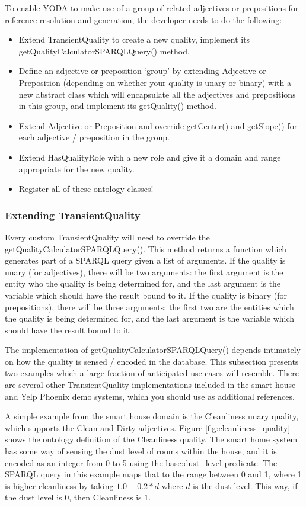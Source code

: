 \documentclass[titlepage]{article}
\begin{document}
\noindent To enable YODA to make use of a group of related adjectives or prepositions for reference resolution and generation, the developer needs to do the following:
\begin{itemize}
\item Extend TransientQuality to create a new quality, implement its getQualityCalculatorSPARQLQuery() method.
\item Define an adjective or preposition `group' by extending Adjective or Preposition (depending on whether your quality is unary or binary) with a new abstract class which will encapsulate all the adjectives and prepositions in this group, and implement its getQuality() method.
\item Extend Adjective or Preposition and override getCenter() and getSlope() for each adjective / preposition in the group.
\item Extend HasQualityRole with a new role and give it a domain and range appropriate for the new quality.
\item Register all of these ontology classes!
\end{itemize}


\subsubsection{Extending TransientQuality}

Every custom TransientQuality will need to override the getQualityCalculatorSPARQLQuery().
This method returns a function which generates part of a SPARQL query given a list of arguments.
If the quality is unary (for adjectives), there will be two arguments: the first argument is the entity who the quality is being determined for, and the last argument is the variable which should have the result bound to it.
If the quality is binary (for prepositions), there will be three arguments: the first two are the entities which the quality is being determined for, and the last argument is the variable which should have the result bound to it.

The implementation of getQualityCalculatorSPARQLQuery() depends intimately on how the quality is sensed / encoded in the database.
This subsection presents two examples which a large fraction of anticipated use cases will resemble.
There are several other TransientQuality implementations included in the smart house and Yelp Phoenix demo systems, which you should use as additional references.


A simple example from the smart house domain is the Cleanliness unary quality, which supports the Clean and Dirty adjectives.
Figure \ref{fig:cleanliness_quality} shows the ontology definition of the Cleanliness quality.
The smart home system has some way of sensing the dust level of rooms within the house, and it is encoded as an integer from 0 to 5 using the base:dust\_level predicate.
The SPARQL query in this example maps that to the range between 0 and 1, where 1 is higher cleanliness by taking $1.0 - 0.2 * d$ where $d$ is the dust level.
This way, if the dust level is $0$, then Cleanliness is $1$.
\end{document}

